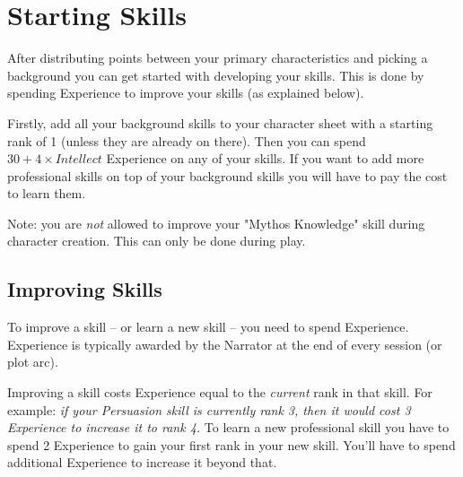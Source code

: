 \section{Starting Skills}
After distributing points between your primary characteristics and picking a background
you can get started with developing your skills. This is done by spending Experience to improve your skills (as explained below). 

Firstly, add all your background skills to your character sheet with a starting rank of 1 (unless they are already on there). 
Then you can spend $30 + 4 \times Intellect$ Experience on any of your skills.
If you want to add more professional skills on top of your background skills
you will have to pay the cost to learn them.

Note: you are \textit{not} allowed to improve your "Mythos Knowledge" skill during character creation.
This can only be done during play. 

\subsection{Improving Skills}
To improve a skill -- or learn a new skill -- you need to spend Experience.
Experience is typically awarded by the Narrator at the end of every session (or plot arc).

Improving a skill costs Experience equal to the \textit{current} rank in that skill.
For example: \textit{if your Persuasion skill is currently rank 3, then it would cost 3 Experience to increase it to rank 4.}
To learn a new professional skill you have to spend 2 Experience to gain your first rank in your new skill.
You'll have to spend additional Experience to increase it beyond that.






